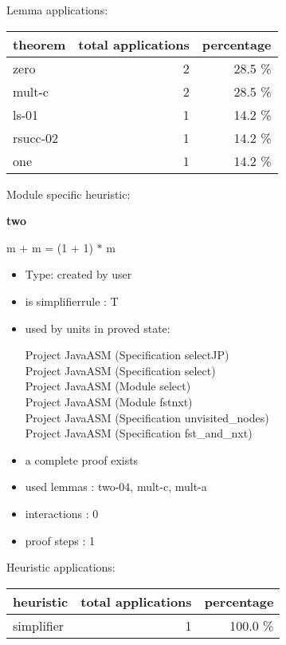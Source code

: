 \documentclass[a4paper]{article}
\begin{document}
Lemma applications:

\begin{supertabular}{l|r|r}
theorem	        & total applications & percentage \\ \hline
zero & 2 & 28.5 \% \\
mult-c & 2 & 28.5 \% \\
ls-01 & 1 & 14.2 \% \\
rsucc-02 & 1 & 14.2 \% \\
one & 1 & 14.2 \% \\

\end{supertabular}

Module specific heuristic:

\pagebreak

{\LARGE\bf two}\label{lemma-two}

\medskip

 \Fol m + m = (1 + 1) $*$ m

\begin{itemize}

\item Type: created by user

\item is simplifierrule : T
\item used by units in proved state:

Project JavaASM (Specification selectJP) \\
Project JavaASM (Specification select) \\
Project JavaASM (Module select) \\
Project JavaASM (Module fstnxt) \\
Project JavaASM (Specification unvisited\_nodes) \\
Project JavaASM (Specification fst\_and\_nxt)
\item       a complete proof exists
\item       used lemmas  : two-04, mult-c, mult-a
\item       interactions : 0
\item       proof steps  : 1
\end{itemize}

\medskip


Heuristic applications:

\begin{supertabular}{l|r|r}
heuristic	& total applications & percentage \\ \hline
simplifier & 1 & 100.0 \% \\

\end{supertabular}
\end{document}
